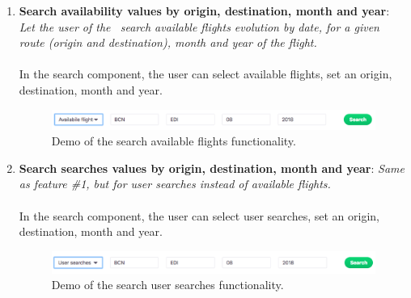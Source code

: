 \begin{enumerate}
    \item \textbf{Search availability values by origin, destination, month and year}: \textit{Let the user of the \thesis\ search available flights evolution by date, for a given route (origin and destination), month and year of the flight.}
    \\\\
    In the search component, the user can select available flights, set an origin, destination, month and year.
    \begin{figure}[H]
    \centering
    \includegraphics[scale=0.35]{resources/search-availability.png}
    \caption{Demo of the search available flights functionality.}
    \end{figure}

    \item \textbf{Search searches values by origin, destination, month and year}: \textit{Same as feature \#1, but for user searches instead of available flights.}
    \\\\
    In the search component, the user can select user searches, set an origin, destination, month and year.
    \begin{figure}[H]
    \centering
    \includegraphics[scale=0.35]{resources/search-searches.png}
    \caption{Demo of the search user searches functionality.}
    \end{figure}


\end{enumerate}
